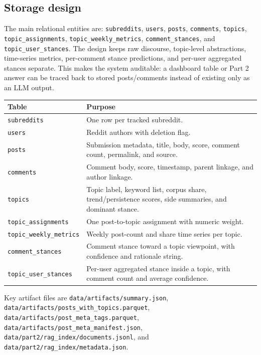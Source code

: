 \documentclass[11pt]{article}
\begin{document}
        \subsection*{Storage design}
        The main relational entities are: \texttt{subreddits}, \texttt{users}, \texttt{posts}, \texttt{comments}, \texttt{topics}, \texttt{topic\_assignments}, \texttt{topic\_weekly\_metrics}, \texttt{comment\_stances}, and \texttt{topic\_user\_stances}. The design keeps raw discourse, topic-level abstractions, time-series metrics, per-comment stance predictions, and per-user aggregated stances separate. This makes the system auditable: a dashboard table or Part 2 answer can be traced back to stored posts/comments instead of existing only as an LLM output.

        \begin{center}
        \begin{tabular}{|p{}|p{}|}
        \hline
        Table & Purpose \\ \hline
        \texttt{subreddits} & One row per tracked subreddit. \\ \hline
        \texttt{users} & Reddit authors with deletion flag. \\ \hline
        \texttt{posts} & Submission metadata, title, body, score, comment count, permalink, and source. \\ \hline
        \texttt{comments} & Comment body, score, timestamp, parent linkage, and author linkage. \\ \hline
        \texttt{topics} & Topic label, keyword list, corpus share, trend/persistence scores, side summaries, and dominant stance. \\ \hline
        \texttt{topic\_assignments} & One post-to-topic assignment with numeric weight. \\ \hline
        \texttt{topic\_weekly\_metrics} & Weekly post-count and share time series per topic. \\ \hline
        \texttt{comment\_stances} & Comment stance toward a topic viewpoint, with confidence and rationale string. \\ \hline
        \texttt{topic\_user\_stances} & Per-user aggregated stance inside a topic, with comment count and average confidence. \\ \hline
        \end{tabular}
        \end{center}

        Key artifact files are \texttt{data/artifacts/summary.json}, \texttt{data/artifacts/posts\_with\_topics.parquet}, \texttt{data/artifacts/post\_meta\_tags.parquet}, \texttt{data/artifacts/post\_meta\_manifest.json}, \texttt{data/part2/rag\_index/documents.jsonl}, and \texttt{data/part2/rag\_index/metadata.json}.
\end{document}
